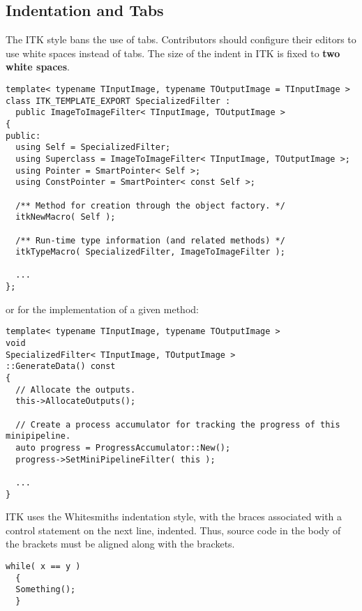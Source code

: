\subsection{Indentation and Tabs}
\label{subsec:IndentationAndTabs}

The ITK style bans the use of tabs. Contributors should configure their editors
to use white spaces instead of tabs. The size of the indent in ITK is fixed to
\textbf{two white spaces}.

\small
\begin{verbatim}
template< typename TInputImage, typename TOutputImage = TInputImage >
class ITK_TEMPLATE_EXPORT SpecializedFilter :
  public ImageToImageFilter< TInputImage, TOutputImage >
{
public:
  using Self = SpecializedFilter;
  using Superclass = ImageToImageFilter< TInputImage, TOutputImage >;
  using Pointer = SmartPointer< Self >;
  using ConstPointer = SmartPointer< const Self >;

  /** Method for creation through the object factory. */
  itkNewMacro( Self );

  /** Run-time type information (and related methods) */
  itkTypeMacro( SpecializedFilter, ImageToImageFilter );

  ...
};
\end{verbatim}
\normalsize

or for the implementation of a given method:

\small
\begin{verbatim}
template< typename TInputImage, typename TOutputImage >
void
SpecializedFilter< TInputImage, TOutputImage >
::GenerateData() const
{
  // Allocate the outputs.
  this->AllocateOutputs();

  // Create a process accumulator for tracking the progress of this minipipeline.
  auto progress = ProgressAccumulator::New();
  progress->SetMiniPipelineFilter( this );

  ...
}
\end{verbatim}
\normalsize

ITK uses the Whitesmiths indentation style, with the braces associated with
a control statement on the next line, indented. Thus, source code in the body of
the brackets must be aligned along with the brackets.

\small
\begin{verbatim}
while( x == y )
  {
  Something();
  }
\end{verbatim}
\normalsize


